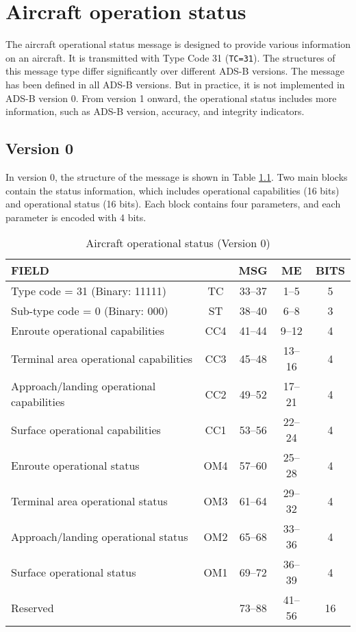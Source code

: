 \chapter{Aircraft operation status}\label{aircraft-operation-status}

The aircraft operational status message is designed to provide various information on an aircraft. It is transmitted with Type Code 31 (\texttt{TC=31}). The structures of this message type differ significantly over different ADS-B versions. The message has been defined in all ADS-B versions. But in practice, it is not implemented in ADS-B version 0. From version 1 onward, the operational status includes more information, such as ADS-B version, accuracy, and integrity indicators. 


\section{Version 0}

In version 0, the structure of the message is shown in Table \ref{tb:adsb-operational-status-v0}. Two main blocks contain the status information, which includes operational capabilities (16 bits) and operational status (16 bits). Each block contains four parameters, and each parameter is encoded with 4 bits.

\begin{table}[ht]
\caption{Aircraft operational status (Version 0)}
\label{tb:adsb-operational-status-v0}
\footnotesize
\begin{tabular}{|l|c|c|c|c|}
\hline
\textbf{FIELD} &  & \textbf{MSG} & \textbf{ME} & \textbf{BITS} \\ \hline
Type code = 31 (Binary: 11111) & TC & 33--37 & 1--5 & 5 \\ \hline
Sub-type code = 0 (Binary: 000) & ST & 38--40 & 6--8 & 3 \\ \hline
Enroute operational capabilities & CC4 & 41--44 & 9--12 & 4\\
Terminal area operational capabilities & CC3 & 45--48 & 13--16 & 4\\
Approach/landing operational capabilities & CC2 & 49--52 & 17--21 & 4\\
Surface operational capabilities & CC1 & 53--56 & 22--24 & 4 \\ \hline
Enroute operational status & OM4 & 57--60 & 25--28 & 4\\
Terminal area operational status & OM3 & 61--64 & 29--32 & 4\\
Approach/landing operational status & OM2 & 65--68 & 33--36 & 4 \\
Surface operational status  & OM1 & 69--72 & 36--39 & 4\\ \hline
Reserved & & 73--88 & 41--56 & 16 \\ \hline
\end{tabular}
\end{table}

